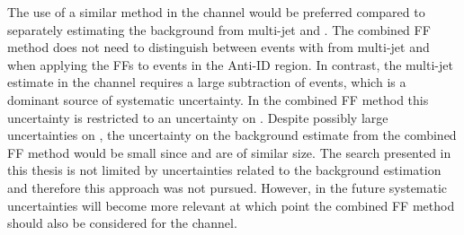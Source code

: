 The use of a similar method in the \hadhad channel would be preferred compared
to separately estimating the \faketauhadvis background from multi-jet and
\ttbar. The combined FF method does not need to distinguish between events with
\faketauhadvis from multi-jet and \ttbar when applying the FFs to events in the
Anti-ID region. In contrast, the multi-jet estimate in the \hadhad channel
requires a large subtraction of \ttbarFakes events, which is a dominant source
of systematic uncertainty. In the combined FF method this uncertainty is
restricted to an uncertainty on \rqcd. Despite possibly large uncertainties on
\rqcd, the uncertainty on the \faketauhadvis background estimate from the
combined FF method would be small since \FFqcd and \FFttbar are of similar
size. The search presented in this thesis is not limited by uncertainties
related to the \faketauhadvis background estimation and therefore this approach
was not pursued. However, in the future systematic uncertainties will become
more relevant at which point the combined FF method should also be considered
for the \hadhad channel.



